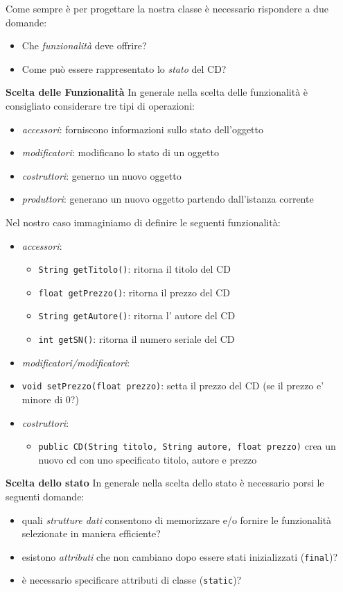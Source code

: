 \documentclass{article}
\begin{document}
Come sempre \`e per progettare la nostra classe \`e necessario rispondere a due domande:
\begin{itemize}
\item Che \emph{funzionalità} deve offrire?
\item Come può essere rappresentato lo \emph{stato} del CD?
\end{itemize}



\textbf{Scelta delle Funzionalit\`a}
In generale nella scelta delle funzionalit\`a \`e consigliato considerare tre tipi di operazioni:
\begin{itemize}
\item \emph{accessori}: forniscono informazioni sullo stato dell'oggetto
\item \emph{modificatori}: modificano lo stato di un oggetto
\item \emph{costruttori}: generno un nuovo oggetto
\item \emph{produttori}: generano un nuovo oggetto partendo dall'istanza corrente
\end{itemize}

Nel nostro caso immaginiamo di definire le seguenti funzionalit\`a:
\begin{itemize}
\item \emph{accessori}:
\begin{itemize}
\item \texttt{String getTitolo()}: ritorna il titolo del CD
\item \texttt{float getPrezzo()}: ritorna il prezzo del CD
\item \texttt{String getAutore()}: ritorna l' autore del CD
\item \texttt{int getSN()}: ritorna il numero seriale del CD
\end{itemize}
\item \emph{modificatori/modificatori}:
\item \texttt{void setPrezzo(float prezzo)}: setta il prezzo del CD (se il prezzo e' minore di 0?)
\item \emph{costruttori}:
\begin{itemize}
\item \texttt{public CD(String titolo, String autore, float prezzo)} crea un nuovo cd con uno specificato titolo, autore e prezzo
\end{itemize}
\end{itemize}


\textbf{Scelta dello stato}
In generale nella scelta dello stato \`e necessario porsi le seguenti domande:
\begin{itemize}
\item quali \emph{strutture dati} consentono di memorizzare e/o fornire le funzionalit\`a selezionate in maniera efficiente?
\item esistono \emph{attributi} che non cambiano dopo essere stati inizializzati (\texttt{final})?
\item \`e necessario specificare attributi di classe (\texttt{static})?
\end{itemize}
\end{document}
